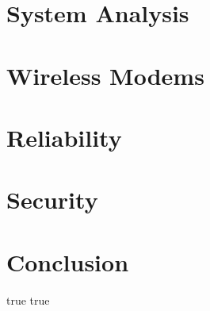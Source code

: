 \documentclass[a4paper,fleqn,english]{book}
\begin{document}
\chapter{System Analysis} \label{sec:txtSystemAnalysis}

%
\chapter{Wireless Modems} \label{sec:txtModems}%
%
%
\chapter{Reliability} \label{sec:txtReliability}

%
\chapter{Security} \label{sec:txtSecurity}

%
\chapter{Conclusion} \label{sec:txtConclusion}%
%
%
%
\nocite{*} %
\literaturverzeichnis%
{true} %
%
%
%
\bezeichnungenChapter%
{true} %
{}




\end{document}
